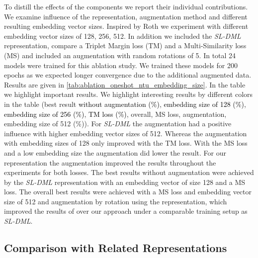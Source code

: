 To distill the effects of the components we report their individual contributions. We examine influence of the representation, augmentation method and different resulting embedding vector sizes. 
Inspired by Roth \andothers \cite{roth2020revisiting} we experiment with different embedding vector sizes of 128, 256, 512. In addition we included the \textit{SL-DML} representation, compare a Triplet Margin loss (TM) and a Multi-Similarity loss (MS) and included an augmentation with random rotations of 5. In total 24 models were trained for this ablation study. We trained these models for 200 epochs as we expected longer convergence due to the additional augmented data. Results are given in \tabname \ref{tab:ablation_oneshot_ntu_embedding_size}. In the table we highlight important results. We highlight interesting results by different colors in the table (best result \textcolor{black}{without augmentation (\%)}, \textcolor{black}{embedding size of 128 (\%)}, \textcolor{black}{embedding size of 256 (\%)}, \textcolor{black}{TM loss (\%)}, overall, MS loss, augmentation, embedding size of 512 (\%)). 
For \textit{SL-DML} the augmentation had a positive influence with higher embedding vector sizes of 512. Whereas the augmentation with embedding sizes of 128 only improved with the TM loss. With the MS loss and a low embedding size the augmentation did lower the result. For our \approachname{} representation the augmentation improved the results throughout the experiments for both losses. The best results without augmentation were achieved by the \textit{SL-DML} representation with an embedding vector of size 128 and a MS loss.
The overall best results were achieved with a MS loss and embedding vector size of 512 and augmentation by rotation using the \approachname{} representation, which improved the results of \skeletondmlaugmentedimpro{} over our approach under a comparable training setup as \textit{SL-DML}.

\subsection{Comparison with Related Representations}

